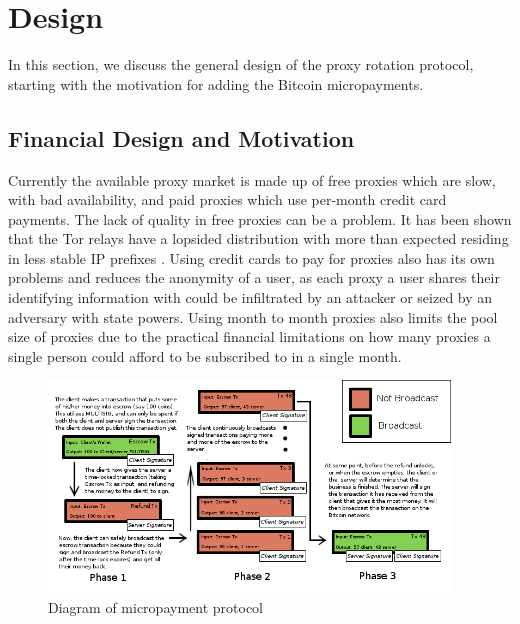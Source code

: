 \section{Design}
\label{sec:design}


In this section, we discuss the general design of the proxy rotation protocol, starting with the motivation for adding the Bitcoin micropayments.

\subsection{Financial Design and Motivation}

Currently the available proxy market is made up of free proxies which are slow, with bad availability, and paid proxies which use per-month credit card payments. The lack of quality in free proxies can be a problem. It has been shown that the Tor relays have a lopsided distribution with more than expected residing in less stable IP prefixes \cite{vanbever2014anonymity}. Using credit cards to pay for proxies also has its own problems and reduces the anonymity of a user, as each proxy a user shares their identifying information with could be infiltrated by an attacker or seized by an adversary with state powers. Using month to month proxies also limits the pool size of proxies due to the practical financial limitations on how many proxies a single person could afford to be subscribed to in a single month. 

\begin{figure}
  \centering
  \includegraphics[width=0.95\textwidth]{microtransactions.png}
  \caption{Diagram of micropayment protocol}
  \label{fig:micropayment-protocol}
\end{figure}


